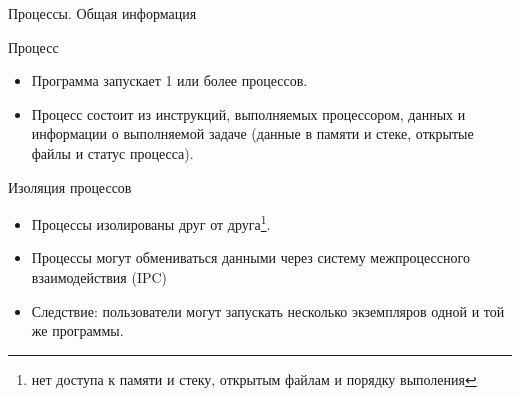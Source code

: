 \begin{frame}{Процессы. Общая информация}
  \begin{block}{Процесс}
    \begin{itemize}
      \item Программа запускает 1 или более процессов. 
      \item Процесс состоит из инструкций, выполняемых процессором, данных и информации о выполняемой задаче (данные в памяти и стеке, открытые файлы и статус процесса).
    \end{itemize} 
  \end{block} \pause

  \begin{block}{Изоляция процессов}
    \begin{itemize}
      \item Процессы изолированы друг от друга\footnote{нет доступа к памяти и стеку, открытым файлам и порядку выполения}.
      \item Процессы могут обмениваться данными через систему межпроцессного взаимодействия (IPC)
      \item Следствие: пользователи могут запускать несколько экземпляров одной и той же программы. 
    \end{itemize}
  \end{block}

\end{frame}
